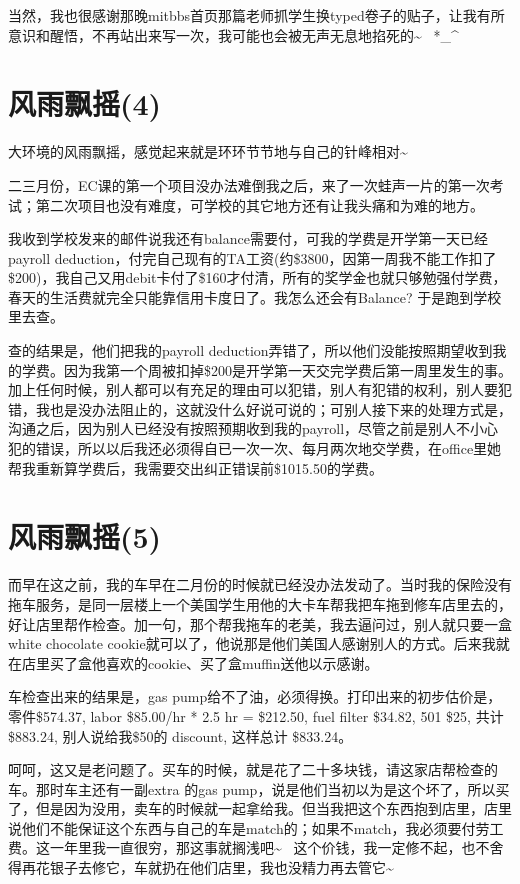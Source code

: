 \documentclass[12pt]{book}
\begin{document}
当然，我也很感谢那晚mitbbs首页那篇老师抓学生换typed卷子的贴子，让我有所意识和醒悟，不再站出来写一次，我可能也会被无声无息地掐死的\textasciitilde{}~  *\_\^{}

\section{风雨飘摇(4)}
\label{sec-33-4}

大环境的风雨飘摇，感觉起来就是环环节节地与自己的针峰相对\textasciitilde{}~

二三月份，EC课的第一个项目没办法难倒我之后，来了一次蛙声一片的第一次考试；第二次项目也没有难度，可学校的其它地方还有让我头痛和为难的地方。

我收到学校发来的邮件说我还有balance需要付，可我的学费是开学第一天已经payroll deduction，付完自己现有的TA工资(约\$3800，因第一周我不能工作扣了\$200)，我自己又用debit卡付了\$160才付清，所有的奖学金也就只够勉强付学费，春天的生活费就完全只能靠信用卡度日了。我怎么还会有Balance? 于是跑到学校里去查。

查的结果是，他们把我的payroll deduction弄错了，所以他们没能按照期望收到我的学费。因为我第一个周被扣掉\$200是开学第一天交完学费后第一周里发生的事。加上任何时候，别人都可以有充足的理由可以犯错，别人有犯错的权利，别人要犯错，我也是没办法阻止的，这就没什么好说可说的；可别人接下来的处理方式是，沟通之后，因为别人已经没有按照预期收到我的payroll，尽管之前是别人不小心犯的错误，所以以后我还必须得自已一次一次、每月两次地交学费，在office里她帮我重新算学费后，我需要交出纠正错误前\$1015.50的学费。

\section{风雨飘摇(5)}
\label{sec-33-5}

而早在这之前，我的车早在二月份的时候就已经没办法发动了。当时我的保险没有拖车服务，是同一层楼上一个美国学生用他的大卡车帮我把车拖到修车店里去的，好让店里帮作检查。加一句，那个帮我拖车的老美，我去逼问过，别人就只要一盒white chocolate cookie就可以了，他说那是他们美国人感谢别人的方式。后来我就在店里买了盒他喜欢的cookie、买了盒muffin送他以示感谢。

车检查出来的结果是，gas pump给不了油，必须得换。打印出来的初步估价是，零件\$574.37, labor \$85.00/hr * 2.5 hr = \$212.50, fuel filter \$34.82, 501 \$25, 共计\$883.24, 别人说给我\$50的 discount, 这样总计 \$833.24。

呵呵，这又是老问题了。买车的时候，就是花了二十多块钱，请这家店帮检查的车。那时车主还有一副extra 的gas pump，说是他们当初以为是这个坏了，所以买了，但是因为没用，卖车的时候就一起拿给我。但当我把这个东西抱到店里，店里说他们不能保证这个东西与自己的车是match的；如果不match，我必须要付劳工费。这一年里我一直很穷，那这事就搁浅吧\textasciitilde{}~  这个价钱，我一定修不起，也不舍得再花银子去修它，车就扔在他们店里，我也没精力再去管它\textasciitilde{}~ 
\end{document}
